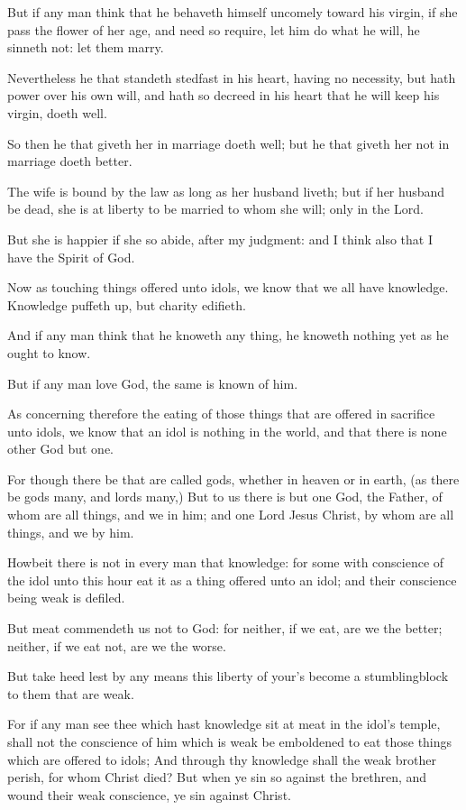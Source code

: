 \Verse But if any man think that he behaveth himself uncomely toward his virgin, if she pass the flower of her age, and need so require, let him do what he will, he sinneth not: let them marry.

\Verse Nevertheless he that standeth stedfast in his heart, having no necessity, but hath power over his own will, and hath so decreed in his heart that he will keep his virgin, doeth well.

\Verse So then he that giveth her in marriage doeth well; but he that giveth her not in marriage doeth better.

\Verse The wife is bound by the law as long as her husband liveth; but if her husband be dead, she is at liberty to be married to whom she will; only in the Lord.

\Verse But she is happier if she so abide, after my judgment: and I think also that I have the Spirit of God.


\Chapter
\Verse Now as touching things offered unto idols, we know that we all have knowledge. Knowledge puffeth up, but charity edifieth.

\Verse And if any man think that he knoweth any thing, he knoweth nothing yet as he ought to know.

\Verse But if any man love God, the same is known of him.

\Verse As concerning therefore the eating of those things that are offered in sacrifice unto idols, we know that an idol is nothing in the world, and that there is none other God but one.

\Verse For though there be that are called gods, whether in heaven or in earth, (as there be gods many, and lords many,) \Verse But to us there is but one God, the Father, of whom are all things, and we in him; and one Lord Jesus Christ, by whom are all things, and we by him.

\Verse Howbeit there is not in every man that knowledge: for some with conscience of the idol unto this hour eat it as a thing offered unto an idol; and their conscience being weak is defiled.

\Verse But meat commendeth us not to God: for neither, if we eat, are we the better; neither, if we eat not, are we the worse.

\Verse But take heed lest by any means this liberty of your's become a stumblingblock to them that are weak.

\Verse For if any man see thee which hast knowledge sit at meat in the idol's temple, shall not the conscience of him which is weak be emboldened to eat those things which are offered to idols; \Verse And through thy knowledge shall the weak brother perish, for whom Christ died?  \Verse But when ye sin so against the brethren, and wound their weak conscience, ye sin against Christ.

